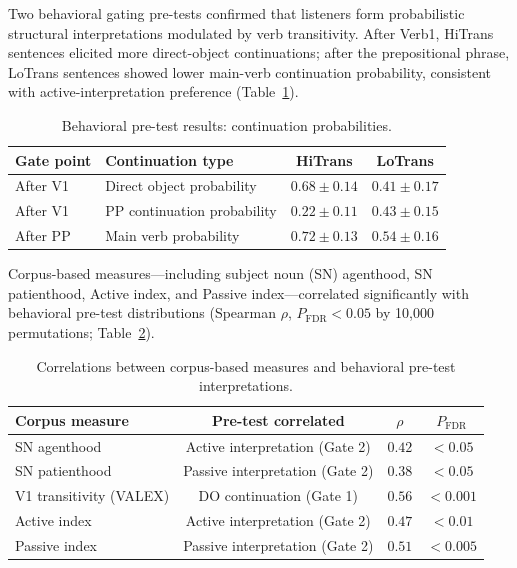 \documentclass[11pt]{article}
\begin{document}
Two behavioral gating pre-tests confirmed that listeners form probabilistic structural interpretations modulated by verb transitivity. After Verb1, HiTrans sentences elicited more direct-object continuations; after the prepositional phrase, LoTrans sentences showed lower main-verb continuation probability, consistent with active-interpretation preference (Table~\ref{tab:pretests}).

\begin{table}[H]
\centering
\caption{Behavioral pre-test results: continuation probabilities.}
\label{tab:pretests}
\begin{tabular}{llcc}
\toprule
\textbf{Gate point} & \textbf{Continuation type} & \textbf{HiTrans} & \textbf{LoTrans} \\
\midrule
After V1 & Direct object probability & $0.68 \pm 0.14$ & $0.41 \pm 0.17$ \\
After V1 & PP continuation probability & $0.22 \pm 0.11$ & $0.43 \pm 0.15$ \\
After PP & Main verb probability & $0.72 \pm 0.13$ & $0.54 \pm 0.16$ \\
\bottomrule
\end{tabular}
\end{table}

Corpus-based measures---including subject noun (SN) agenthood, SN patienthood, Active index, and Passive index---correlated significantly with behavioral pre-test distributions (Spearman $\rho$, $P_\mathrm{FDR} < 0.05$ by 10,000 permutations; Table~\ref{tab:corpus_corr}).

\begin{table}[H]
\centering
\caption{Correlations between corpus-based measures and behavioral pre-test interpretations.}
\label{tab:corpus_corr}
\begin{tabular}{lccc}
\toprule
\textbf{Corpus measure} & \textbf{Pre-test correlated} & \textbf{$\rho$} & \textbf{$P_\mathrm{FDR}$} \\
\midrule
SN agenthood & Active interpretation (Gate 2) & $0.42$ & $<0.05$ \\
SN patienthood & Passive interpretation (Gate 2) & $0.38$ & $<0.05$ \\
V1 transitivity (VALEX) & DO continuation (Gate 1) & $0.56$ & $<0.001$ \\
Active index & Active interpretation (Gate 2) & $0.47$ & $<0.01$ \\
Passive index & Passive interpretation (Gate 2) & $0.51$ & $<0.005$ \\
\bottomrule
\end{tabular}
\end{table}
\end{document}
